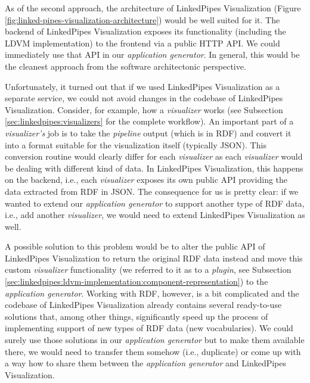 As of the second approach, the architecture of LinkedPipes Visualization (Figure \ref{fig:linked-pipes-visualization-architecture}) would be well suited for it. The backend of LinkedPipes Visualization exposes its functionality (including the LDVM implementation) to the frontend via a public HTTP API. We could immediately use that API in our \emph{application generator}. In general, this would be the cleanest approach from the software architectonic perspective.

Unfortunately, it turned out that if we used LinkedPipes Visualization as a separate service, we could not avoid changes in the codebase of LinkedPipes Visualization. Consider, for example, how a \emph{visualizer} works (see Subsection \ref{sec:linkedpipes:visualizers} for the complete workflow). An important part of a \emph{visualizer's} job is to take the \emph{pipeline} output (which is in RDF) and convert it into a format suitable for the visualization itself (typically JSON). This conversion routine would clearly differ for each \emph{visualizer} as each \emph{visualizer} would be dealing with different kind of data. In LinkedPipes Visualization, this happens on the backend, i.e., each \emph{visualizer} exposes its own public API providing the data extracted from RDF in JSON. The consequence for us is pretty clear: if we wanted to extend our \emph{application generator} to support another type of RDF data, i.e., add another \emph{visualizer}, we would need to extend LinkedPipes Visualization as well. 

A possible solution to this problem would be to alter the public API of LinkedPipes Visualization to return the original RDF data instead and move this custom \emph{visualizer} functionality (we referred to it as to a \emph{plugin}, see Subsection \ref{sec:linkedpipes:ldvm-implementation:component-representation}) to the \emph{application generator}. Working with RDF, however, is a bit complicated and the codebase of LinkedPipes Visualization already contains several ready-to-use solutions that, among other things, significantly speed up the process of implementing support of new types of RDF data (new vocabularies). We could surely use those solutions in our \emph{application generator} but to make them available there, we would need to transfer them somehow (i.e., duplicate) or come up with a way how to share them between the \emph{application generator} and LinkedPipes Visualization.


